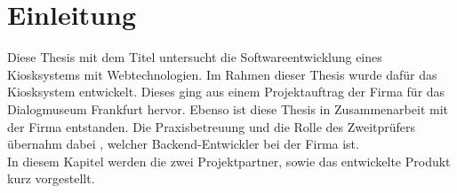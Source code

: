 \chapter{Einleitung}
\label{chap:einleitung}

Diese Thesis mit dem Titel \emph{\getTitle{}} untersucht die Softwareentwicklung eines 
Kiosksystems mit Webtechnologien. Im Rahmen dieser Thesis wurde dafür das Kiosksystem
\emph{\shst{}} entwickelt. Dieses ging aus einem Projektauftrag der Firma 
\mesoFull{} für das Dialogmuseum Frankfurt hervor. Ebenso ist diese Thesis in
Zusammenarbeit mit der Firma \meso{} entstanden. Die Praxisbetreuung und die Rolle
des Zweitprüfers übernahm dabei \getAdvisor{}, welcher Backend-Entwickler
bei der Firma \meso{} ist.\\

In diesem Kapitel werden die zwei Projektpartner, sowie das entwickelte Produkt kurz
vorgestellt.




